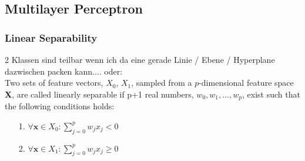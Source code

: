 \documentclass[11pt,a4paper]{article}
\begin{document}
\begin{flushleft}
\subsection{Multilayer Perceptron}
\subsubsection{Linear Separability}
2 Klassen sind teilbar wenn ich da eine gerade Linie / Ebene / Hyperplane dazwischen packen kann.... oder: \\
Two sets of feature vectors, $X_0$, $X_1$, sampled from a $p$-dimensional feature space \textbf{X},
are called linearly separable if p+1 real numbers, $w_0, w_1, . . . , w_p$, exist such that the
following conditions holds:
\begin{itemize}
\item[1.] $ \forall \textbf{x} \in X_0: \sum_{j=0}^p w_jx_j < 0 $
\item[2.]  $ \forall \textbf{x} \in X_1: \sum_{j=0}^p w_jx_j \geq 0 $
\end{itemize}


\end{flushleft}
\end{document}
